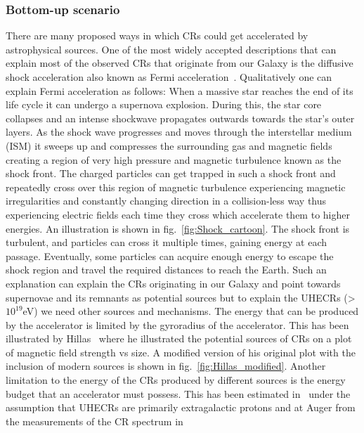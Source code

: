 \subsubsection{Bottom-up scenario}
\label{subsec:Bupsce}
There are many proposed ways in which CRs could get accelerated by astrophysical sources. One of the most widely accepted descriptions that can explain most of the observed CRs that originate from our Galaxy is the diffusive shock acceleration also known as Fermi acceleration~\cite{PhysRev.75.1169}. Qualitatively one can explain Fermi acceleration as follows: When a massive star reaches the end of its life cycle it can undergo a supernova explosion. During this, the star core collapses and an intense shockwave propagates outwards towards the star's outer layers. As the shock wave progresses and moves through the interstellar medium (ISM) it sweeps up and compresses the surrounding gas and magnetic fields creating a region of very high pressure and magnetic turbulence known as the shock front. The charged particles can get trapped in such a shock front and repeatedly cross over this region of magnetic turbulence experiencing magnetic irregularities and constantly changing direction in a collision-less way thus experiencing electric fields each time they cross which accelerate them to higher energies. An illustration is shown in fig.~\ref{fig:Shock_cartoon}. The shock front is turbulent, and particles can cross it multiple times, gaining energy at each passage. Eventually, some particles can acquire enough energy to escape the shock region and travel the required distances to reach the Earth. Such an explanation can explain the CRs originating in our Galaxy and point towards supernovae and its remnants as potential sources but to explain the UHECRs (>$10^{19}$eV) we need other sources and mechanisms. The energy that can be produced by the accelerator is limited by the gyroradius of the accelerator. This has been illustrated by Hillas~\cite{1984ARA&A..22..425H} where he illustrated the potential sources of CRs on a plot of magnetic field strength vs size. A modified version of his original plot with the inclusion of modern sources is shown in fig.~\ref{fig:Hillas_modified}. Another limitation to the energy of the CRs produced by different sources is the energy budget that an accelerator must possess. This has been estimated in~\cite{Murase:2008sa} under the assumption that UHECRs are primarily extragalactic protons and at Auger from the measurements of the CR spectrum in~\cite{2018_auger_comp_spec}

